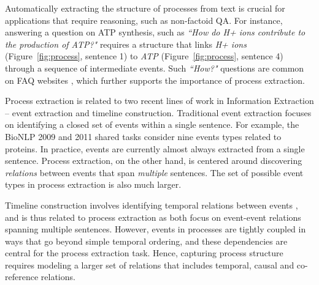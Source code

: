Automatically extracting the structure of processes from text is crucial for applications that require reasoning, such as non-factoid QA. For instance, answering a question on ATP synthesis, such as \emph{``How do H+ ions contribute to the production of ATP?"} requires a structure that links \emph{H+ ions} (Figure~\ref{fig:process}, sentence 1) to \emph{ATP} (Figure~\ref{fig:process}, sentence 4) through a sequence of intermediate events. Such \emph{``How?"} questions are common on FAQ websites \cite{Surdeanu:2011}, which further supports the importance of process extraction.



Process extraction is related to two recent lines of work in Information Extraction -- event extraction and timeline construction.
Traditional event extraction focuses on identifying a closed set of events within a single sentence. 
For example, the BioNLP 2009 and 2011 shared tasks \cite{kim09,kim11} consider nine events types related to proteins. In practice, events are currently almost always extracted from a single sentence.
Process extraction, on the other hand, is centered around discovering \emph{relations} between events that span \emph{multiple} sentences. The set of possible event types in process extraction is also much larger. 

Timeline construction involves identifying temporal relations between events \cite{Do12,Mcclosky12,DSouzaNg:13a}, and is thus related to process extraction as both focus on event-event relations spanning multiple sentences. However, events in processes are tightly coupled in ways that go beyond simple temporal ordering, and these dependencies are central for the process extraction task. Hence, capturing process structure requires modeling a larger set of relations that includes temporal, causal and co-reference relations.

